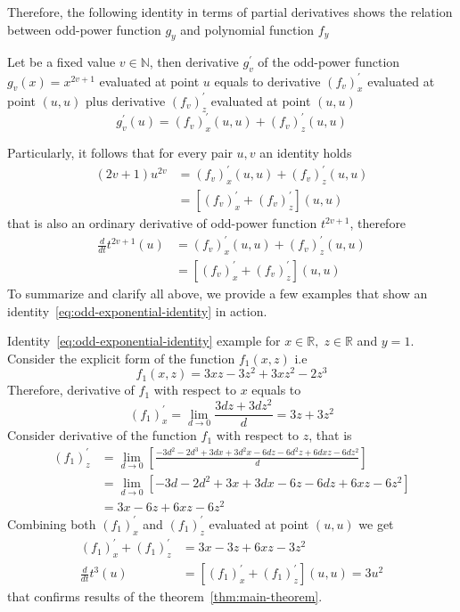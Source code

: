 Therefore, the following identity in terms of partial derivatives shows the relation between odd-power function $g_{y}$ and
polynomial function $f_{y}$
\begin{thm}
    \label{thm:main-theorem}
    Let be a fixed value $v\in \mathbb{N}$, then derivative $g_v^{'}$ of the odd-power function $g_v(x) = x^{2v + 1}$
    evaluated at point $u$ equals to derivative $(f_{v})^{'}_{x}$ evaluated at point $(u, u)$ plus
    derivative $(f_{v})^{'}_{z}$ evaluated at point $(u, u)$
    \begin{equation}
        g_v^{'} (u) = (f_{v})^{'}_{x} (u, u) + (f_{v})^{'}_{z} (u, u)
        \label{eq:odd-exponential-identity}
    \end{equation}
\end{thm}
Particularly, it follows that for every pair $u, v$ an identity holds
\begin{align*}
(2v+1)
    u^{2v} &= (f_{v})^{'}_{x} (u, u) + (f_{v})^{'}_{z} (u, u) \\
    &= [(f_{v})^{'}_{x} + (f_{v})^{'}_{z}](u,u)
\end{align*}
that is also an ordinary derivative of odd-power function $t^{2v+1}$, therefore
\begin{align*}
    \frac{d}{dt} t^{2v+1} (u) &= (f_{v})^{'}_{x} (u, u) + (f_{v})^{'}_{z} (u, u) \\
    &= [(f_{v})^{'}_{x} + (f_{v})^{'}_{z}](u,u)
\end{align*}
To summarize and clarify all above, we provide a few examples that show an identity~\eqref{eq:odd-exponential-identity}
in action.
\begin{example}
    \normalfont
    Identity~\eqref{eq:odd-exponential-identity} example for $x\in\mathbb{R}, \; z\in \mathbb{R}$ and $y=1$.
    Consider the explicit form of the function $f_{1} (x, z)$ i.e
    \[
        f_1(x, z) = 3 x z - 3 z^2 + 3 x z^2 - 2 z^3
    \]
    Therefore, derivative of $f_{1}$ with respect to $x$ equals to
    \[
        (f_1)^{'}_{x} = \lim_{d \to 0} \frac{3 d z + 3 d z^2}{d} = 3 z + 3 z^2
    \]
    Consider derivative of the function $f_1$ with respect to $z$, that is
    \begin{align*}
    (f_1)
        ^{'}_{z}
        &= \lim_{d \to 0} \left[\frac{-3 d^2 - 2 d^3 + 3 d x + 3 d^2 x - 6 d z - 6 d^2 z + 6 d x z - 6 d z^2}{d} \right] \\
        &= \lim_{d \to 0} \left[ -3 d - 2 d^2 + 3 x + 3 d x - 6 z - 6 d z + 6 x z - 6 z^2 \right] \\
        &=3 x - 6 z + 6 x z - 6 z^2
    \end{align*}
    Combining both $(f_1)^{'}_{x}$ and $(f_1)^{'}_{z}$ evaluated at point $(u, u)$ we get
    \begin{align*}
    (f_1)
        ^{'}_{x} + (f_1)^{'}_{z}
        &= 3 x - 3 z + 6 x z - 3 z^2 \\
        \frac{d}{dt} t^{3} (u) &= [(f_1)^{'}_{x} + (f_1)^{'}_{z}] (u,u)  = 3 u^2
    \end{align*}
    that confirms results of the theorem~\ref{thm:main-theorem}.
\end{example}
